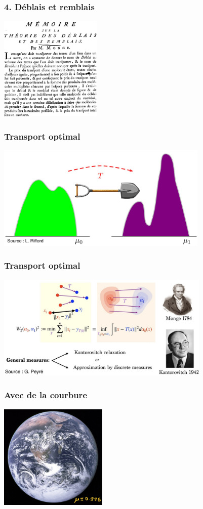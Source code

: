 \documentclass[9pt]{beamer}
\begin{document}
\begin{frame}
\frametitle{\bf 4. D\'eblais et remblais}
 
\centering \includegraphics[height=5.0cm]{deblais2}

\end{frame}

\begin{frame}
\frametitle{\bf Transport optimal}
 
\centering \includegraphics[height=5.0cm]{ot1}

\end{frame}

\begin{frame}
\frametitle{\bf Transport optimal}
 
\centering \includegraphics[height=5.0cm]{ot2}

\end{frame}

\begin{frame}
\frametitle{\bf Avec de la courbure}
 
\centering \includegraphics[height=5.0cm]{terre}

\end{frame}
\end{document}
